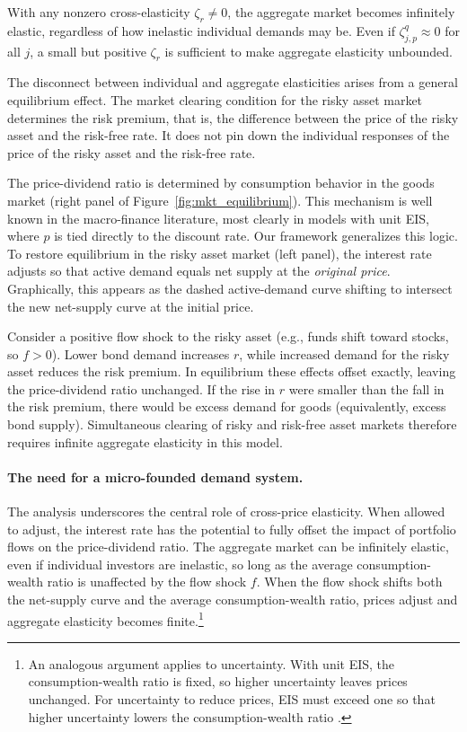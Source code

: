 \documentclass[12pt,english]{article}
\begin{document}
With any nonzero cross-elasticity $\zeta_r \neq 0$, the aggregate market becomes infinitely elastic, regardless of how inelastic individual demands may be.
Even if $\zeta_{j,p}^q \approx 0$ for all $j$, a small but positive $\zeta_r$ is sufficient to make aggregate elasticity unbounded.

The disconnect between individual and aggregate elasticities arises from a general equilibrium effect.
The market clearing condition for the risky asset market determines the risk premium, that is, the difference between the price of the risky asset and the risk-free rate.
It does not pin down the individual responses of the price of the risky asset and the risk-free rate.

The price-dividend ratio is determined by consumption behavior in the goods market (right panel of Figure~\ref{fig:mkt_equilibrium}).
This mechanism is well known in the macro-finance literature, most clearly in models with unit EIS, where $p$ is tied directly to the discount rate.
Our framework generalizes this logic.
To restore equilibrium in the risky asset market (left panel), the interest rate adjusts so that active demand equals net supply at the \textit{original price}.
Graphically, this appears as the dashed active-demand curve shifting to intersect the new net-supply curve at the initial price.

Consider a positive flow shock to the risky asset (e.g., funds shift toward stocks, so $f>0$).
Lower bond demand increases $r$, while increased demand for the risky asset reduces the risk premium.
In equilibrium these effects offset exactly, leaving the price-dividend ratio unchanged.
If the rise in $r$ were smaller than the fall in the risk premium, there would be excess demand for goods (equivalently, excess bond supply).
Simultaneous clearing of risky and risk-free asset markets therefore requires infinite aggregate elasticity in this model.

\paragraph{The need for a micro-founded demand system.}
The analysis underscores the central role of cross-price elasticity.
When allowed to adjust, the interest rate has the potential to fully offset the impact of portfolio flows on the price-dividend ratio.
The aggregate market can be infinitely elastic, even if individual investors are inelastic, so long as the average consumption-wealth ratio is unaffected by the flow shock $f$.
When the flow shock shifts both the net-supply curve and the average consumption-wealth ratio, prices adjust and aggregate elasticity becomes finite.\footnote{An analogous argument applies to uncertainty. With unit EIS, the consumption-wealth ratio is fixed, so higher uncertainty leaves prices unchanged.   For uncertainty to reduce prices, EIS must exceed one so that higher uncertainty lowers the consumption-wealth ratio \citep[see][]{bansal2004risks}.}
\end{document}
